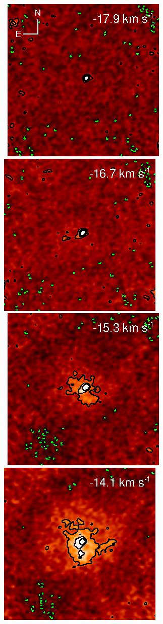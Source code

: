 \documentclass[iop]{emulateapj}
\begin{document}
\begin{figure}[hbt!]
\centering
\mbox{
          \includegraphics[]{f3.ps}
          \includegraphics[]{f4.ps}
          }
\\
\mbox{
          \includegraphics[]{f5.ps}
          \includegraphics[]{f6.ps}
}
\end{figure}
\end{document}
